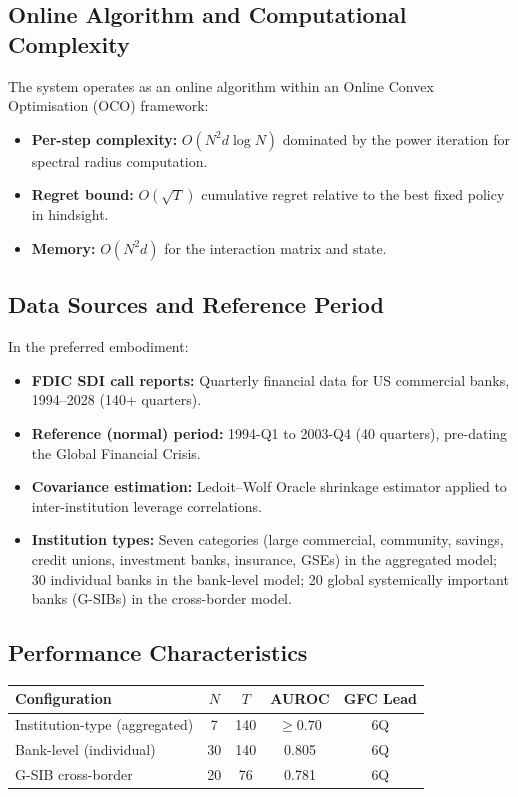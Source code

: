 \documentclass[12pt,a4paper]{article}
\begin{document}
\subsection{Online Algorithm and Computational Complexity}

The system operates as an online algorithm within an Online Convex 
Optimisation (OCO) framework:
\begin{itemize}
\item \textbf{Per-step complexity:} $O(N^2 d \log N)$ dominated by the 
power iteration for spectral radius computation.
\item \textbf{Regret bound:} $O(\sqrt{T})$ cumulative regret relative to 
the best fixed policy in hindsight.
\item \textbf{Memory:} $O(N^2 d)$ for the interaction matrix and state.
\end{itemize}

\subsection{Data Sources and Reference Period}

In the preferred embodiment:
\begin{itemize}
\item \textbf{FDIC SDI call reports:} Quarterly financial data for US 
commercial banks, 1994--2028 (140+ quarters).
\item \textbf{Reference (normal) period:} 1994-Q1 to 2003-Q4 (40 
quarters), pre-dating the Global Financial Crisis.
\item \textbf{Covariance estimation:} Ledoit--Wolf Oracle shrinkage 
estimator applied to inter-institution leverage correlations.
\item \textbf{Institution types:} Seven categories (large commercial, 
community, savings, credit unions, investment banks, insurance, GSEs) in 
the aggregated model; 30 individual banks in the bank-level model; 20 
global systemically important banks (G-SIBs) in the cross-border model.
\end{itemize}

\subsection{Performance Characteristics}

\begin{center}
\begin{tabular}{lcccc}
\toprule
\textbf{Configuration} & \textbf{$N$} & \textbf{$T$} & \textbf{AUROC} & 
\textbf{GFC Lead} \\
\midrule
Institution-type (aggregated) & 7 & 140 & $\geq 0.70$ & 6Q \\
Bank-level (individual) & 30 & 140 & 0.805 & 6Q \\
G-SIB cross-border & 20 & 76 & 0.781 & 6Q \\
\bottomrule
\end{tabular}
\end{center}
\end{document}
